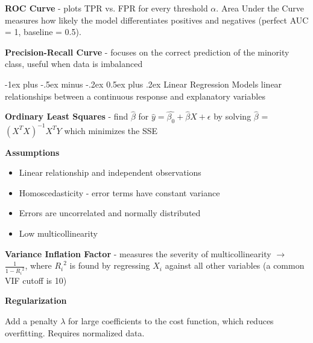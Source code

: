 \documentclass[10pt,landscape]{article}
\makeatletter
\renewcommand{\section}{\@startsection{section}{1}{0mm}%
                                {-1ex plus -.5ex minus -.2ex}%
                                {0.5ex plus .2ex}%
                                {\normalfont\large\bfseries}}
\makeatother
\begin{document}
\begin{multicols}{3}
\textbf{ROC Curve} - plots TPR vs. FPR for every threshold $\alpha$. Area Under the Curve  measures how likely the model differentiates positives and negatives (perfect AUC = 1, baseline = 0.5).

\textbf{Precision-Recall Curve} - focuses on the correct prediction of the minority class, useful when data is imbalanced

\section{Linear Regression}
Models linear relationships between a continuous response and explanatory variables

\textbf{Ordinary Least Squares} - find $\hat{\beta}$ for $\hat{y} = \hat{\beta_{0}} + \hat{\beta}X + \epsilon$
by solving $\hat{\beta}$ = $(X^{T}X)^{-1}X^{T}Y$ which minimizes the SSE

\textbf{Assumptions}
\begin{itemize}[label={--},leftmargin=4mm]
\vspace{-1mm}
\itemsep -.4mm
    \item Linear relationship and independent observations
    \item Homoscedasticity - error terms have constant variance
    \item Errors are uncorrelated and normally distributed
    \item Low multicollinearity
\end{itemize}

\textbf{Variance Inflation Factor} - measures the severity of multicollinearity $\to$ $\frac{1}{1-{R_i}^2}$, where ${R_i}^2$ is found by regressing $X_i$ against all other variables (a common VIF cutoff is 10)

\textbf{Regularization}

Add a penalty $\lambda$ for large coefficients to the cost function, which reduces overfitting. Requires normalized data.


\end{multicols}
\end{document}
